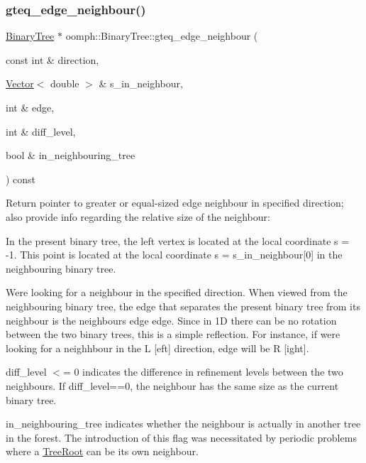 \subsubsection{\texorpdfstring{gteq\+\_\+edge\+\_\+neighbour()}{gteq\_edge\_neighbour()}\hspace{0.1cm}{\footnotesize\ttfamily [1/2]}}
{\footnotesize\ttfamily \hyperlink{classoomph_1_1BinaryTree}{Binary\+Tree} $\ast$ oomph\+::\+Binary\+Tree\+::gteq\+\_\+edge\+\_\+neighbour (\begin{DoxyParamCaption}\item[{const int \&}]{direction,  }\item[{\hyperlink{classoomph_1_1Vector}{Vector}$<$ double $>$ \&}]{s\+\_\+in\+\_\+neighbour,  }\item[{int \&}]{edge,  }\item[{int \&}]{diff\+\_\+level,  }\item[{bool \&}]{in\+\_\+neighbouring\+\_\+tree }\end{DoxyParamCaption}) const}



Return pointer to greater or equal-\/sized edge neighbour in specified {\ttfamily direction}; also provide info regarding the relative size of the neighbour\+: 


\begin{DoxyItemize}
\item In the present binary tree, the left vertex is located at the local coordinate s = -\/1. This point is located at the local coordinate s = {\ttfamily s\+\_\+in\+\_\+neighbour}\mbox{[}0\mbox{]} in the neighbouring binary tree.
\item We\textquotesingle{}re looking for a neighbour in the specified {\ttfamily direction}. When viewed from the neighbouring binary tree, the edge that separates the present binary tree from its neighbour is the neighbour\textquotesingle{}s {\ttfamily edge} edge. Since in 1D there can be no rotation between the two binary trees, this is a simple reflection. For instance, if we\textquotesingle{}re looking for a neighhbour in the {\ttfamily L} \mbox{[}eft\mbox{]} {\ttfamily direction}, {\ttfamily edge} will be {\ttfamily R} \mbox{[}ight\mbox{]}.
\item {\ttfamily diff\+\_\+level} $<$= 0 indicates the difference in refinement levels between the two neighbours. If {\ttfamily diff\+\_\+level==0}, the neighbour has the same size as the current binary tree.
\item {\ttfamily in\+\_\+neighbouring\+\_\+tree} indicates whether the neighbour is actually in another tree in the forest. The introduction of this flag was necessitated by periodic problems where a \hyperlink{classoomph_1_1TreeRoot}{Tree\+Root} can be its own neighbour.
\end{DoxyItemize}

